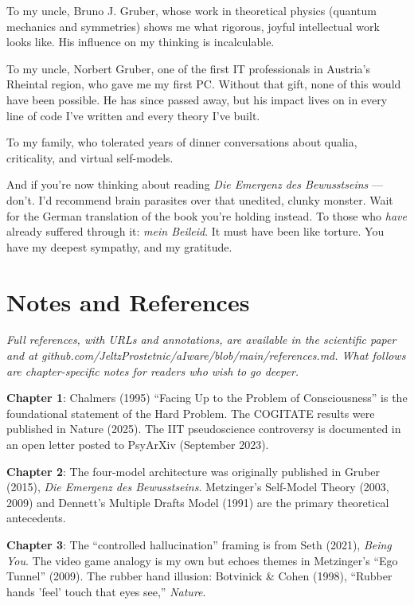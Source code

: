 \documentclass[11pt, twoside, openright]{book}
\begin{document}
To my uncle, Bruno J. Gruber, whose work in theoretical physics (quantum mechanics and symmetries) shows me what rigorous, joyful intellectual work looks like. His influence on my thinking is incalculable.

To my uncle, Norbert Gruber, one of the first IT professionals in Austria's Rheintal region, who gave me my first PC. Without that gift, none of this would have been possible. He has since passed away, but his impact lives on in every line of code I've written and every theory I've built.

To my family, who tolerated years of dinner conversations about qualia, criticality, and virtual self-models.

And if you're now thinking about reading \textit{Die Emergenz des Bewusstseins} --- don't. I'd recommend brain parasites over that unedited, clunky monster. Wait for the German translation of the book you're holding instead. To those who \textit{have} already suffered through it: \textit{mein Beileid}. It must have been like torture. You have my deepest sympathy, and my gratitude.


\chapter*{Notes and References}

\textit{Full references, with URLs and annotations, are available in the scientific paper and at github.com/\allowbreak{}JeltzProstetnic/\allowbreak{}aIware/\allowbreak{}blob/\allowbreak{}main/\allowbreak{}references.md. What follows are chapter-specific notes for readers who wish to go deeper.}

\textbf{Chapter 1}: Chalmers (1995) ``Facing Up to the Problem of Consciousness'' is the foundational statement of the Hard Problem. The COGITATE results were published in Nature (2025). The IIT pseudoscience controversy is documented in an open letter posted to PsyArXiv (September 2023).

\textbf{Chapter 2}: The four-model architecture was originally published in Gruber (2015), \textit{Die Emergenz des Bewusstseins}. Metzinger's Self-Model Theory (2003, 2009) and Dennett's Multiple Drafts Model (1991) are the primary theoretical antecedents.

\textbf{Chapter 3}: The ``controlled hallucination'' framing is from Seth (2021), \textit{Being You}. The video game analogy is my own but echoes themes in Metzinger's ``Ego Tunnel'' (2009). The rubber hand illusion: Botvinick \& Cohen (1998), ``Rubber hands 'feel' touch that eyes see,'' \textit{Nature}.
\end{document}
